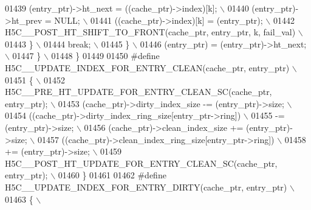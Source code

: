 \begin{DoxyCode}
01439 \textcolor{preprocessor}{                (entry\_ptr)->ht\_next = ((cache\_ptr)->index)[k];             \(\backslash\)}
01440 \textcolor{preprocessor}{                (entry\_ptr)->ht\_prev = NULL;                                \(\backslash\)}
01441 \textcolor{preprocessor}{                ((cache\_ptr)->index)[k] = (entry\_ptr);                      \(\backslash\)}
01442 \textcolor{preprocessor}{                H5C\_\_POST\_HT\_SHIFT\_TO\_FRONT(cache\_ptr, entry\_ptr, k, fail\_val) \(\backslash\)}
01443 \textcolor{preprocessor}{            \}                                                               \(\backslash\)}
01444 \textcolor{preprocessor}{            break;                                                          \(\backslash\)}
01445 \textcolor{preprocessor}{        \}                                                                   \(\backslash\)}
01446 \textcolor{preprocessor}{        (entry\_ptr) = (entry\_ptr)->ht\_next;                                 \(\backslash\)}
01447 \textcolor{preprocessor}{    \}                                                                       \(\backslash\)}
01448 \textcolor{preprocessor}{\}}
01449 
01450 \textcolor{preprocessor}{#define H5C\_\_UPDATE\_INDEX\_FOR\_ENTRY\_CLEAN(cache\_ptr, entry\_ptr)   \(\backslash\)}
01451 \textcolor{preprocessor}{\{                                                                 \(\backslash\)}
01452 \textcolor{preprocessor}{    H5C\_\_PRE\_HT\_UPDATE\_FOR\_ENTRY\_CLEAN\_SC(cache\_ptr, entry\_ptr);  \(\backslash\)}
01453 \textcolor{preprocessor}{    (cache\_ptr)->dirty\_index\_size -= (entry\_ptr)->size;           \(\backslash\)}
01454 \textcolor{preprocessor}{    ((cache\_ptr)->dirty\_index\_ring\_size[entry\_ptr->ring])         \(\backslash\)}
01455 \textcolor{preprocessor}{        -= (entry\_ptr)->size;                             \(\backslash\)}
01456 \textcolor{preprocessor}{    (cache\_ptr)->clean\_index\_size += (entry\_ptr)->size;           \(\backslash\)}
01457 \textcolor{preprocessor}{    ((cache\_ptr)->clean\_index\_ring\_size[entry\_ptr->ring])         \(\backslash\)}
01458 \textcolor{preprocessor}{        += (entry\_ptr)->size;                             \(\backslash\)}
01459 \textcolor{preprocessor}{    H5C\_\_POST\_HT\_UPDATE\_FOR\_ENTRY\_CLEAN\_SC(cache\_ptr, entry\_ptr); \(\backslash\)}
01460 \textcolor{preprocessor}{\}}
01461 
01462 \textcolor{preprocessor}{#define H5C\_\_UPDATE\_INDEX\_FOR\_ENTRY\_DIRTY(cache\_ptr, entry\_ptr)   \(\backslash\)}
01463 \textcolor{preprocessor}{\{                                                                 \(\backslash\)}

\end{DoxyCode}
